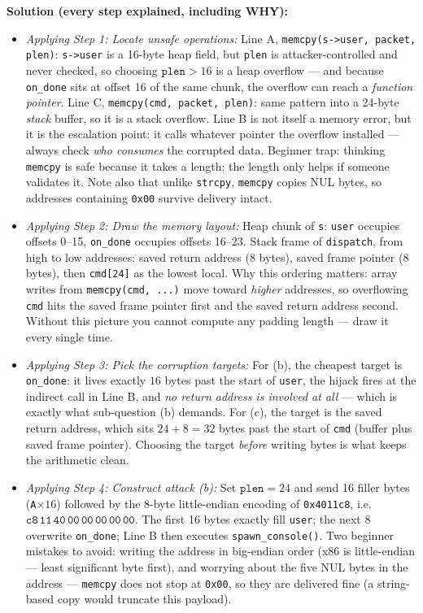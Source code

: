 \documentclass[12pt, a4paper]{article}
\begin{document}
\textbf{Solution (every step explained, including WHY):}
\begin{itemize}
    \item \textit{Applying Step 1: Locate unsafe operations:} Line A, \texttt{memcpy(s->user, packet, plen)}: \texttt{s->user} is a 16-byte heap field, but \texttt{plen} is attacker-controlled and never checked, so choosing $\texttt{plen} > 16$ is a heap overflow --- and because \texttt{on\_done} sits at offset 16 of the same chunk, the overflow can reach a \emph{function pointer}. Line C, \texttt{memcpy(cmd, packet, plen)}: same pattern into a 24-byte \emph{stack} buffer, so it is a stack overflow. Line B is not itself a memory error, but it is the escalation point: it calls whatever pointer the overflow installed --- always check \emph{who consumes} the corrupted data. Beginner trap: thinking \texttt{memcpy} is safe because it takes a length; the length only helps if someone validates it. Note also that unlike \texttt{strcpy}, \texttt{memcpy} copies NUL bytes, so addresses containing \texttt{0x00} survive delivery intact.
    \item \textit{Applying Step 2: Draw the memory layout:} Heap chunk of \texttt{s}: \texttt{user} occupies offsets 0--15, \texttt{on\_done} occupies offsets 16--23. Stack frame of \texttt{dispatch}, from high to low addresses: saved return address (8 bytes), saved frame pointer (8 bytes), then \texttt{cmd[24]} as the lowest local. Why this ordering matters: array writes from \texttt{memcpy(cmd, ...)} move toward \emph{higher} addresses, so overflowing \texttt{cmd} hits the saved frame pointer first and the saved return address second. Without this picture you cannot compute any padding length --- draw it every single time.
    \item \textit{Applying Step 3: Pick the corruption targets:} For (b), the cheapest target is \texttt{on\_done}: it lives exactly $16$ bytes past the start of \texttt{user}, the hijack fires at the indirect call in Line B, and \emph{no return address is involved at all} --- which is exactly what sub-question (b) demands. For (c), the target is the saved return address, which sits $24 + 8 = 32$ bytes past the start of \texttt{cmd} (buffer plus saved frame pointer). Choosing the target \emph{before} writing bytes is what keeps the arithmetic clean.
    \item \textit{Applying Step 4: Construct attack (b):} Set $\texttt{plen} = 24$ and send 16 filler bytes (\texttt{A}$\times 16$) followed by the 8-byte little-endian encoding of \texttt{0x4011c8}, i.e. $\texttt{c8}\,\texttt{11}\,\texttt{40}\,\texttt{00}\,\texttt{00}\,\texttt{00}\,\texttt{00}\,\texttt{00}$. The first 16 bytes exactly fill \texttt{user}; the next 8 overwrite \texttt{on\_done}; Line B then executes \texttt{spawn\_console()}. Two beginner mistakes to avoid: writing the address in big-endian order (x86 is little-endian --- least significant byte first), and worrying about the five NUL bytes in the address --- \texttt{memcpy} does not stop at \texttt{0x00}, so they are delivered fine (a string-based copy would truncate this payload).

\end{itemize}
\end{document}
